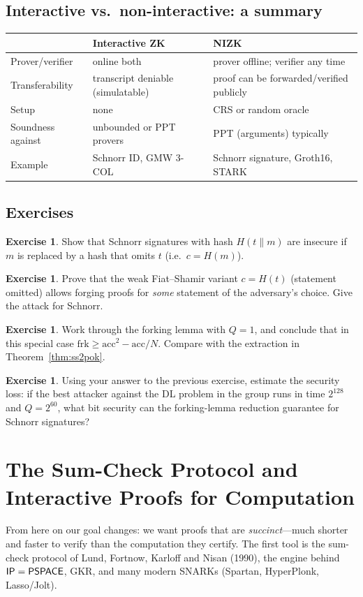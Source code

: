 \documentclass[11pt,a4paper]{report}
\theoremstyle{plain}
\theoremstyle{definition}
\newtheorem{exercise}[theorem]{Exercise}
\theoremstyle{remark}
\newcommand{\PSPACE}{\mathsf{PSPACE}}\newcommand{\AM}{\mathsf{AM}}\newcommand{\coAM}{\mathsf{coAM}}
\begin{document}
\section{Interactive vs.\ non-interactive: a summary}
\begin{center}\small
\begin{tabular}{@{}L{3.0cm}L{5.4cm}L{5.4cm}@{}}\toprule
 & Interactive ZK & NIZK \\\midrule
Prover/verifier & online both & prover offline; verifier any time\\
Transferability & transcript deniable (simulatable) & proof can be forwarded/verified publicly \\
Setup & none & CRS or random oracle\\
Soundness against & unbounded or PPT provers & PPT (arguments) typically\\
Example & Schnorr ID, GMW 3-COL & Schnorr signature, Groth16, STARK \\\bottomrule
\end{tabular}
\end{center}

\section*{Exercises}
\begin{exercise}
Show that Schnorr signatures with hash $H(t\|m)$ are insecure if $m$ is replaced by a hash that omits $t$ (i.e.\ $c=H(m)$).
\end{exercise}
\begin{exercise}\label{ex:weakfs}
Prove that the weak Fiat--Shamir variant $c=H(t)$ (statement omitted) allows forging proofs for \emph{some} statement of the adversary's choice. Give the attack for Schnorr.
\end{exercise}
\begin{exercise}
Work through the forking lemma with $Q=1$, and conclude that in this special case $\mathrm{frk}\ge\mathrm{acc}^2-\mathrm{acc}/N$. Compare with the extraction in Theorem~\ref{thm:ss2pok}.
\end{exercise}
\begin{exercise}\label{ex:forkloss}
Using your answer to the previous exercise, estimate the security loss: if the best attacker against the DL problem in the group runs in time $2^{128}$ and $Q=2^{60}$, what bit security can the forking-lemma reduction guarantee for Schnorr signatures?
\end{exercise}

\chapter{The Sum-Check Protocol and Interactive Proofs for Computation}
\label{ch:sumcheck}
From here on our goal changes: we want proofs that are \emph{succinct}---much shorter and faster to verify than the computation they certify. The first tool is the sum-check protocol of Lund, Fortnow, Karloff and Nisan (1990), the engine behind $\IP=\PSPACE$, GKR, and many modern SNARKs (Spartan, HyperPlonk, Lasso/Jolt).
\end{document}
